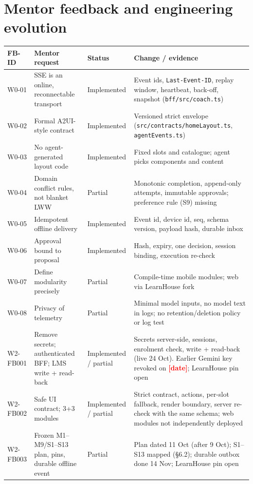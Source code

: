 \documentclass[11pt,a4paper]{article}
\newcommand{\fillin}[1]{\textcolor{red}{\textbf{[#1]}}}
\newcommand{\fp}[1]{\nolinkurl{#1}}
\begin{document}
\section{Mentor feedback and engineering evolution}
\begin{xltabular}{\textwidth}{L{0.12\textwidth}L{0.25\textwidth}L{0.13\textwidth}Y}
\toprule
\textbf{FB-ID} & \textbf{Mentor request} & \textbf{Status} & \textbf{Change / evidence} \\
\midrule
W0-01 & SSE is an online, reconnectable transport & Implemented & Event ids, \texttt{Last-Event-ID}, replay window, heartbeat, back-off, snapshot (\fp{bff/src/coach.ts}) \\
W0-02 & Formal A2UI-style contract & Implemented & Versioned strict envelope (\fp{src/contracts/homeLayout.ts}, \fp{agentEvents.ts}) \\
W0-03 & No agent-generated layout code & Implemented & Fixed slots and catalogue; agent picks components and content \\
W0-04 & Domain conflict rules, not blanket LWW & Partial & Monotonic completion, append-only attempts, immutable approvals; preference rule (S9) missing \\
W0-05 & Idempotent offline delivery & Implemented & Event id, device id, seq, schema version, payload hash, durable inbox \\
W0-06 & Approval bound to proposal & Implemented & Hash, expiry, one decision, session binding, execution re-check \\
W0-07 & Define modularity precisely & Partial & Compile-time mobile modules; web via LearnHouse fork \\
W0-08 & Privacy of telemetry & Partial & Minimal model inputs, no model text in logs; no retention/deletion policy or log test \\
W2-FB001 & Remove secrets; authenticated BFF; LMS write + read-back & Implemented / partial & Secrets server-side, sessions, enrolment check, write + read-back (live 24 Oct). Earlier Gemini key revoked on \fillin{date}; LearnHouse pin open \\
W2-FB002 & Safe UI contract; 3+3 modules & Implemented / partial & Strict contract, actions, per-slot fallback, render boundary, server re-check with the same schema; web modules not independently deployed \\
W2-FB003 & Frozen M1–M9/S1–S13 plan, pins, durable offline event & Partial & Plan dated 11 Oct (after 9 Oct); S1–S13 mapped (§6.2); durable outbox done 14 Nov; LearnHouse pin open \\

\end{xltabular}
\end{document}

